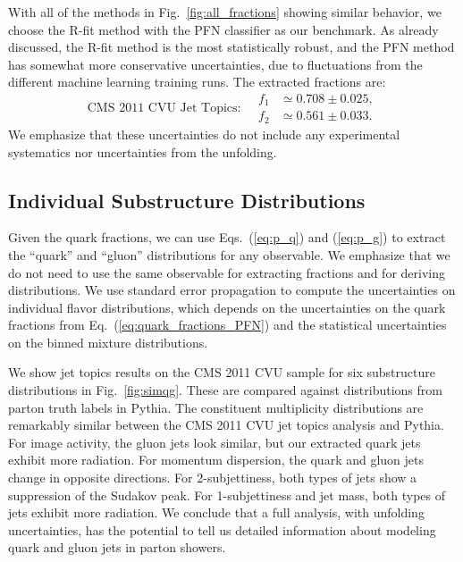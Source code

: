 \documentclass[aps,prd,twocolumn,preprintnumbers,nofootinbib,longbibliography,floatfix]{revtex4-1}
\DeclareRobustCommand{\Fig}[1]{Fig.~\ref{#1}}
\DeclareRobustCommand{\Eq}[1]{Eq.~(\ref{#1})}
\DeclareRobustCommand{\Eqs}[2]{Eqs.~(\ref{#1}) and (\ref{#2})}
\newcommand{\Pythia}{{\sc Pythia}\xspace}
\newcommand{\cor}[1]{#1}
\begin{document}
With all of the methods in \Fig{fig:all_fractions} showing similar behavior, we choose the R-fit method with the PFN classifier as our benchmark.
%
As already discussed, the R-fit method is the most statistically robust, and the PFN method has somewhat more conservative uncertainties, due to fluctuations from the different machine learning training runs.
% 
The extracted fractions are:
%
\begin{equation}
	\label{eq:quark_fractions_PFN}
	\text{CMS 2011 CVU Jet Topics:} \quad
	\begin{aligned}
		f_1 &\simeq 0.708 \pm 0.025, \\
		f_2 &\simeq 0.561 \pm 0.033.
	\end{aligned}
\end{equation}
%
We emphasize that these uncertainties do not include any experimental systematics \cor{nor} uncertainties from the unfolding.



\subsection{Individual Substructure Distributions}

Given the quark fractions, we can use \Eqs{eq:p_q}{eq:p_g} to extract the ``quark''
and ``gluon'' distributions for any observable.
%
We emphasize that we do not need to use the same observable for extracting fractions and for deriving distributions.
%
We use standard error propagation to compute the uncertainties on individual flavor distributions, which depends on the uncertainties on the quark fractions from \Eq{eq:quark_fractions_PFN} and the statistical uncertainties on the binned mixture distributions.


We show jet topics results on the CMS 2011 CVU sample for six substructure distributions in \Fig{fig:simqg}.
%
These are compared against distributions from parton truth labels in \Pythia.
%
The constituent multiplicity distributions are remarkably similar between the CMS 2011 CVU jet topics analysis and \Pythia. %
%
For image activity, the gluon jets look similar, but our extracted quark jets exhibit more radiation.
%
For momentum dispersion, the quark and gluon jets change in opposite directions.
%
For 2-subjettiness, both types of jets show a suppression of the Sudakov peak.
%
For 1-subjettiness and jet mass, both types of jets exhibit more radiation.
%
We conclude that a full analysis, with unfolding uncertainties, has the potential to tell us detailed information about modeling quark and gluon jets in parton showers.
\end{document}
